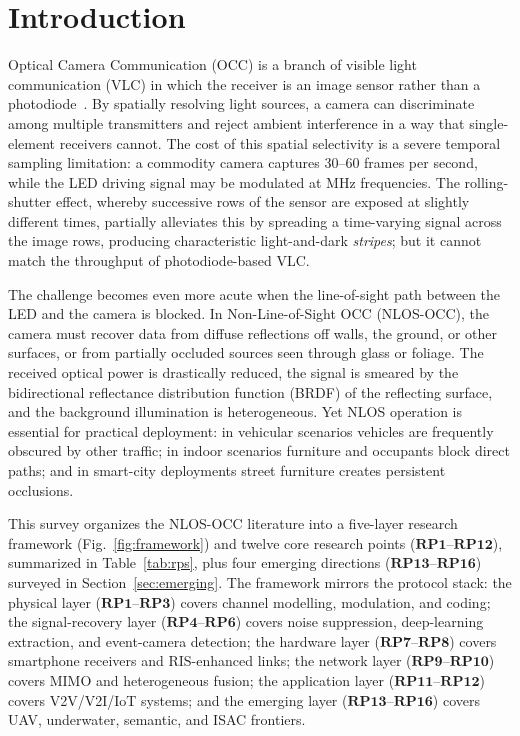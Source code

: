 \documentclass[10pt,a4paper]{article}
\newcommand{\rp}[1]{\textbf{RP#1}}
\begin{document}
\section{Introduction}
\label{sec:intro}

Optical Camera Communication (OCC) is a branch of visible light
communication (VLC) in which the receiver is an image sensor rather
than a photodiode~\cite{ieee8021572018}. By spatially resolving light
sources, a camera can discriminate among multiple transmitters and
reject ambient interference in a way that single-element receivers
cannot. The cost of this spatial selectivity is a severe temporal
sampling limitation: a commodity camera captures 30--60 frames per
second, while the LED driving signal may be modulated at MHz
frequencies. The rolling-shutter effect, whereby successive rows of the
sensor are exposed at slightly different times, partially alleviates
this by spreading a time-varying signal across the image rows, producing
characteristic light-and-dark \emph{stripes}; but it cannot match the
throughput of photodiode-based VLC.

The challenge becomes even more acute when the line-of-sight path
between the LED and the camera is blocked. In Non-Line-of-Sight OCC
(NLOS-OCC), the camera must recover data from diffuse reflections off
walls, the ground, or other surfaces, or from partially occluded sources
seen through glass or foliage. The received optical power is drastically
reduced, the signal is smeared by the bidirectional reflectance
distribution function (BRDF) of the reflecting surface, and the
background illumination is heterogeneous. Yet NLOS operation is
essential for practical deployment: in vehicular scenarios vehicles are
frequently obscured by other traffic; in indoor scenarios furniture and
occupants block direct paths; and in smart-city deployments street
furniture creates persistent occlusions.

This survey organizes the NLOS-OCC literature into a five-layer research
framework (Fig.~\ref{fig:framework}) and twelve core research points
($\rp{1}$--$\rp{12}$), summarized in Table~\ref{tab:rps}, plus four
emerging directions ($\rp{13}$--$\rp{16}$) surveyed in
Section~\ref{sec:emerging}. The framework
mirrors the protocol stack: the physical layer ($\rp{1}$--$\rp{3}$)
covers channel modelling, modulation, and coding; the signal-recovery
layer ($\rp{4}$--$\rp{6}$) covers noise suppression, deep-learning
extraction, and event-camera detection; the hardware layer
($\rp{7}$--$\rp{8}$) covers smartphone receivers and RIS-enhanced links;
the network layer ($\rp{9}$--$\rp{10}$) covers MIMO and heterogeneous
fusion; the application layer ($\rp{11}$--$\rp{12}$) covers
V2V/V2I/IoT systems; and the emerging layer ($\rp{13}$--$\rp{16}$)
covers UAV, underwater, semantic, and ISAC frontiers.
\end{document}
